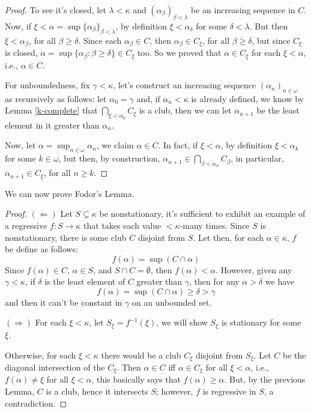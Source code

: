 \begin{proof}
    To see it's closed, let $\lambda<\kappa$ and $(\alpha_\beta)_{\beta<\lambda}$ be an increasing sequence in $C$. Now, if $\xi<\alpha=\sup\{\alpha_\beta\}_{\beta<\lambda}$, by definition $\xi<\alpha_\delta$ for some $\delta<\lambda$. But then $\xi<\alpha_\beta$, for all $\beta\geq\delta$. Since each $\alpha_\beta\in C$, then $\alpha_\beta\in C_\xi$, for all $\beta\geq\delta$, but since $C_\xi$ is closed, $\alpha=\sup\{\alpha_\beta:\beta\geq\delta\}\in C_\xi$ too. So we proved that $\alpha\in C_\xi$ for each $\xi<\alpha$, i.e., $\alpha\in C$.

    For unboundedness, fix $\gamma<\kappa$, let's construct an increasing sequence $(\alpha_n)_{n\in\omega}$ as recursively as follows: let $\alpha_0=\gamma$ and, if $\alpha_n<\kappa$ is already defined, we know by Lemma \ref{k-complete} that $\bigcap_{\xi<\alpha_0}C_\xi$ is a club, then we can let $\alpha_{n+1}$ be the least element in it greater than $\alpha_n$.

    Now, let $\alpha=\sup_{n\in\omega}\alpha_n$, we claim $\alpha\in C$. In fact, if $\xi<\alpha$, by definition $\xi<\alpha_k$ for some $k\in\omega$, but then, by construction, $\alpha_{n+1}\in\bigcap_{\beta<\alpha_n}C_\beta$, in particular, $\alpha_{n+1}\in C_\xi$, for all $n\geq k$.
\end{proof}

We can now prove Fodor's Lemma.

\begin{proof}
    $(\Leftarrow)$ Let $S\subseteq\kappa$ be nonstationary, it's sufficient to exhibit an example of a regressive $f:S\to\kappa$ that takes each value $<\!\kappa$-many times. Since $S$ is nonstationary, there is some club $C$ disjoint from $S$. Let then, for each $\alpha\in\kappa$, $f$ be define as follows:
    $$f(\alpha)=\sup(C\cap\alpha)$$
    Since $f(\alpha)\in C$, $\alpha\in S$, and $S\cap C=\emptyset$, then $f(\alpha)<\alpha$. However, given any $\gamma<\kappa$, if $\delta$ is the least element of $C$ greater than $\gamma$, then for any $\alpha>\delta$ we have
    $$f(\alpha)=\sup(C\cap\alpha)\geq \delta>\gamma$$
    and then it can't be constant in $\gamma$ on an unbounded set.

    $(\Rightarrow)$ For each $\xi<\kappa$, let $S_\xi=f^{-1}(\xi)$, we will show $S_\xi$ is stationary for some $\xi$.

    Otherwise, for each $\xi<\kappa$ there would be a club $C_\xi$ disjoint from $S_\xi$. Let $C$ be the diagonal intersection of the $C_\xi$. Then $\alpha\in C$ iff $\alpha\in C_\xi$ for all $\xi<\alpha$, i.e., $f(\alpha)\neq\xi$ for all $\xi<\alpha$, this basically says that $f(\alpha)\geq\alpha$. But, by the previous Lemma, $C$ is a club, hence it intersects $S$; however, $f$ is regressive in $S$, a contradiction.
\end{proof}

